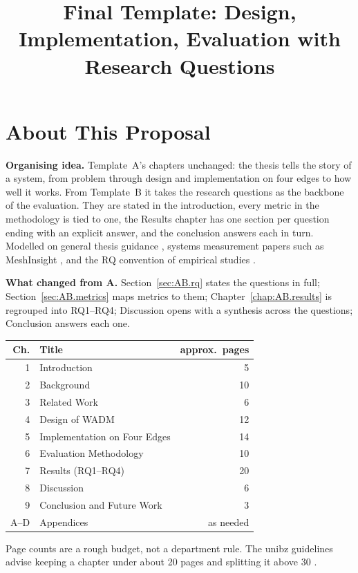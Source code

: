 \documentclass{rptuma}
\title{Final Template: Design, Implementation, Evaluation with Research Questions}
\begin{document}
\maketitle
{}
\setcounter{page}{1}

\chapter*{About This Proposal}

\textbf{Organising idea.} Template~A's chapters unchanged: the thesis tells the story of a
system, from problem through design and implementation on four edges to how well it works. From
Template~B it takes the research questions as the backbone of the evaluation. They are stated in
the introduction, every metric in the methodology is tied to one, the Results chapter has one
section per question ending with an explicit answer, and the conclusion answers each in turn.
Modelled on general thesis guidance \cite{intille_thesis,unibz_guidelines}, systems measurement
papers such as MeshInsight \cite{zhu2022dissecting}, and the RQ convention of empirical studies
\cite{wohlin2012experimentation}.

\textbf{What changed from A.} Section~\ref{sec:AB.rq} states the questions in full;
Section~\ref{sec:AB.metrics} maps metrics to them; Chapter~\ref{chap:AB.results} is regrouped into
RQ1--RQ4; Discussion opens with a synthesis across the questions; Conclusion answers each one.

\begin{center}
\small
\begin{tabularx}{\textwidth}{@{}rXr@{}}
\toprule
Ch. & Title & approx.\ pages \\
\midrule
1 & Introduction & 5 \\
2 & Background & 10 \\
3 & Related Work & 6 \\
4 & Design of WADM & 12 \\
5 & Implementation on Four Edges & 14 \\
6 & Evaluation Methodology & 10 \\
7 & Results (RQ1--RQ4) & 20 \\
8 & Discussion & 6 \\
9 & Conclusion and Future Work & 3 \\
A--D & Appendices & as needed \\
\bottomrule
\end{tabularx}
\end{center}
{\footnotesize Page counts are a rough budget, not a department rule. The unibz guidelines
advise keeping a chapter under about 20 pages and splitting it above 30 \cite{unibz_guidelines}.}
\end{document}
